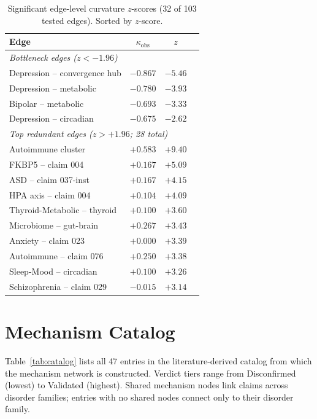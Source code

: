 \documentclass[11pt]{article}
\begin{document}
\begin{table}[h]
\centering
\caption{Significant edge-level curvature $z$-scores (32 of 103 tested edges). Sorted by $z$-score.}
\label{tab:edge_full}
\small
\begin{tabular}{lccc}
\toprule
Edge & $\kappa_{\text{obs}}$ & $z$ \\
\midrule
\multicolumn{3}{l}{\emph{Bottleneck edges ($z < -1.96$)}} \\
Depression -- convergence hub & $-0.867$ & $\mathbf{-5.46}$ \\
Depression -- metabolic & $-0.780$ & $\mathbf{-3.93}$ \\
Bipolar -- metabolic & $-0.693$ & $-3.33$ \\
Depression -- circadian & $-0.675$ & $-2.62$ \\
\midrule
\multicolumn{3}{l}{\emph{Top redundant edges ($z > +1.96$; 28 total)}} \\
Autoimmune cluster & $+0.583$ & $\mathbf{+9.40}$ \\
FKBP5 -- claim 004 & $+0.167$ & $+5.09$ \\
ASD -- claim 037-inst & $+0.167$ & $+4.15$ \\
HPA axis -- claim 004 & $+0.104$ & $+4.09$ \\
Thyroid-Metabolic -- thyroid & $+0.100$ & $+3.60$ \\
Microbiome -- gut-brain & $+0.267$ & $+3.43$ \\
Anxiety -- claim 023 & $+0.000$ & $+3.39$ \\
Autoimmune -- claim 076 & $+0.250$ & $+3.38$ \\
Sleep-Mood -- circadian & $+0.100$ & $+3.26$ \\
Schizophrenia -- claim 029 & $-0.015$ & $+3.14$ \\
\bottomrule
\end{tabular}
\end{table}

\section{Mechanism Catalog}
\label{app:catalog}

Table~\ref{tab:catalog} lists all 47 entries in the literature-derived catalog from which the mechanism network is constructed. Verdict tiers range from Disconfirmed (lowest) to Validated (highest). Shared mechanism nodes link claims across disorder families; entries with no shared nodes connect only to their disorder family.
\end{document}

